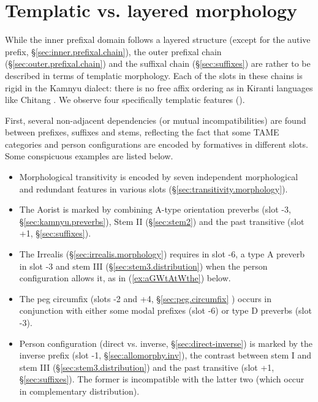  

 \section{Templatic vs. layered morphology} \label{sec:templatic.verb}
While the inner prefixal domain follows a layered structure (except for the autive prefix, §\ref{sec:inner.prefixal.chain}), the outer prefixal chain (§\ref{sec:outer.prefixal.chain}) and the suffixal chain (§\ref{sec:suffixes}) are rather to be described in terms of templatic morphology. Each of the slots in these chains is rigid in the Kamnyu dialect: there is no free affix ordering as in Kiranti languages like Chitang \citep{bickel07chintang}. We observe four specifically templatic features (\citealt[216--218]{bickel07inflectional}). 

First, several non-adjacent dependencies (or mutual incompatibilities) are found between prefixes, suffixes and stems, reflecting the fact that some TAME categories and person configurations are encoded by formatives in different slots. Some conspicuous examples are listed below.

\begin{itemize}
\item Morphological transitivity is encoded by seven independent morphological and redundant features in various slots (§\ref{sec:transitivity.morphology}).
\item The Aorist is marked by combining A-type orientation preverbs  (slot -3, §\ref{sec:kamnyu.preverbs}), Stem II (§\ref{sec:stem2}) and the past transitive  (slot +1, §\ref{sec:suffixes}).
\item  The Irrealis (§\ref{sec:irrealis.morphology}) requires  in slot -6, a type A preverb in slot -3 and stem III (§\ref{sec:stem3.distribution}) when the person configuration allows it, as in (\ref{ex:aGWtAtWthe}) below.
\item The peg circumfix  (slots -2 and +4, §\ref{sec:peg.circumfix} ) occurs in conjunction with either some modal prefixes (slot -6) or type D preverbs (slot -3).
\item   Person configuration (direct vs. inverse, §\ref{sec:direct-inverse}) is marked by the inverse prefix (slot -1, §\ref{sec:allomorphy.inv}), the contrast between stem I and stem III (§\ref{sec:stem3.distribution}) and the past transitive  (slot +1, §\ref{sec:suffixes}). The former is incompatible with the latter two (which occur in complementary distribution). 
\end{itemize}

